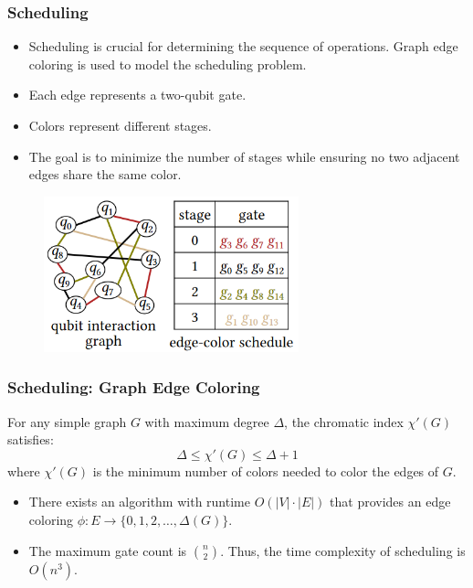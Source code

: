 \documentclass[18 pt]{beamer}
\begin{document}
\begin{frame}
    \frametitle{Scheduling}
    \begin{itemize}
        \item Scheduling is crucial for determining the sequence of operations. Graph edge coloring is used to model the scheduling problem.
        \item Each edge represents a two-qubit gate.
        \item Colors represent different stages.
        \item The goal is to minimize the number of stages while ensuring no two adjacent edges share the same color.
    \end{itemize}
    \begin{figure}
        \includegraphics[height=4.5cm]{color.png}
    \end{figure}
    
\end{frame}

\begin{frame}
    \frametitle{Scheduling: Graph Edge Coloring}
    \begin{theorem}
    For any simple graph \( G \) with maximum degree \( \Delta \), the chromatic index \(\chi'(G)\) satisfies:
\[
\Delta \leq \chi'(G) \leq \Delta + 1
\]
where \(\chi'(G)\) is the minimum number of colors needed to color the edges of \( G \).

    \end{theorem}
    \begin{itemize}
        \item There exists an algorithm with runtime \( O(|V| \cdot |E|) \) that provides an edge coloring \(\phi: E \to \{0, 1, 2, \dots, \Delta(G)\}\).
        \item The maximum gate count is \( \binom{n}{2} \). Thus, the time complexity of scheduling is \( O(n^3) \).
    \end{itemize}    
\end{frame}
\end{document}

